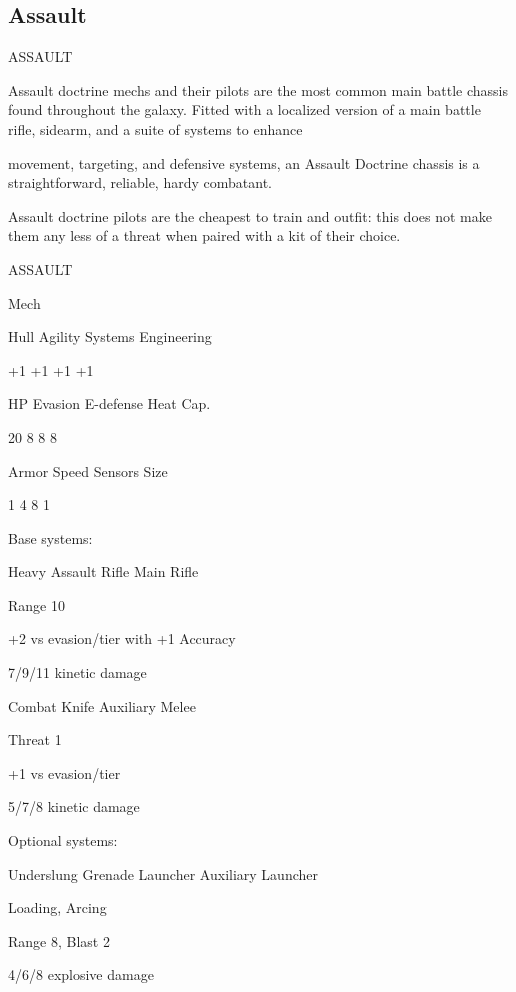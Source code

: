 \subsection{Assault}
                                                ASSAULT  

Assault doctrine mechs and their pilots are the most common main battle chassis found throughout the  
galaxy. Fitted with a localized version of a main battle rifle, sidearm, and a suite of systems to enhance  

movement, targeting, and defensive systems, an Assault Doctrine chassis is a straightforward, reliable,  
hardy combatant.   

Assault doctrine pilots are the cheapest to train and outfit: this does not make them any less of a threat  
when paired with a kit of their choice.   

       ASSAULT 

       Mech 

       Hull       Agility      Systems       Engineering 

       +1         +1           +1            +1 

       HP         Evasion      E-defense     Heat Cap. 

       20         8            8             8 

       Armor      Speed        Sensors       Size 

       1          4            8             1 

Base systems:
 
Heavy Assault Rifle  
Main Rifle
 
Range 10
 
+2 vs evasion/tier with +1 Accuracy
 
7/9/11 kinetic damage
 

Combat Knife  
Auxiliary Melee
 
Threat 1
 
+1 vs evasion/tier
 
5/7/8 kinetic damage
 

                                                                                                           


Optional systems:
 
Underslung Grenade Launcher  
Auxiliary Launcher
 
Loading, Arcing
 
Range 8, Blast 2
 
4/6/8 explosive damage
 

